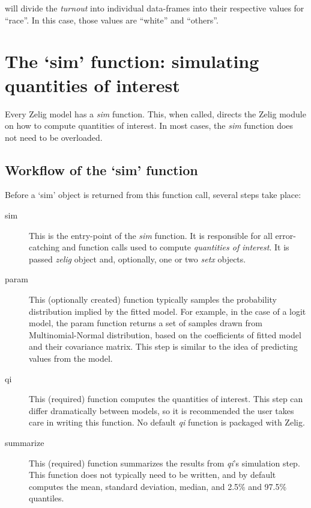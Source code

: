 will divide the \emph{turnout} into individual data-frames into their respective values for ``race''.  In this case, those values are ``white'' and ``others''.



\section{The `sim' function: simulating quantities of interest}

Every Zelig model has a \emph{sim} function.  This, when called, directs the Zelig module on how to compute quantities of interest.  In most cases, the \emph{sim} function does not need to be overloaded.

\subsection{Workflow of the `sim' function}

Before a `sim' object is returned from this function call, several steps take place:

\begin{description}

	\item[sim]{This is the entry-point of the \emph{sim} function.  It is responsible for all error-catching and function calls used to compute \emph{quantities of interest}.  It is passed \emph{zelig} object and, optionally, one or two \emph{setx} objects.}

	\item[param]{This (optionally created) function typically samples the probability distribution implied by the fitted model.  For example, in the case of a logit model, the param function returns a set of samples drawn from Multinomial-Normal distribution, based on the coefficients of fitted model and their covariance matrix.  This step is similar to the idea of predicting values from the model.}
	
	\item[qi]{This (required) function computes the quantities of interest.  This step can differ dramatically between models, so it is recommended the user takes care in writing this function.  No default \emph{qi} function is packaged with Zelig.}
	
	\item[summarize]{This (required) function summarizes the results from \emph{qi}'s simulation step.  This function does not typically need to be written, and by default computes the mean, standard deviation, median, and 2.5\% and 97.5\% quantiles.}
	
\end{description}


